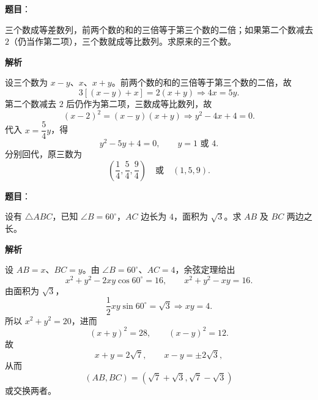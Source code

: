 \begin{answer}

\textbf{题目}：

三个数成等差数列，前两个数的和的三倍等于第三个数的二倍；如果第二个数减去 $2$（仍当作第二项），三个数就成等比数列。求原来的三个数。

\textbf{解析}

设三个数为 $x-y$、$x$、$x+y$。前两个数的和的三倍等于第三个数的二倍，故
\nopagebreak[4]
\[
3[(x-y)+x]=2(x+y)\Rightarrow4x=5y.
\]
第二个数减去 $2$ 后仍作为第二项，三数成等比数列，故
\nopagebreak[4]
\[
(x-2)^2=(x-y)(x+y)\Rightarrow y^2-4x+4=0.
\]
代入 $x=\dfrac54y$，得
\nopagebreak[4]
\[
y^2-5y+4=0,\qquad y=1\text{ 或 }4.
\]
分别回代，原三数为
\nopagebreak[4]
\[
\left(\frac14,\frac54,\frac94\right)\quad\text{或}\quad(1,5,9).
\]


\end{answer}
\begin{answer}

\textbf{题目}：

设有 $\triangle ABC$，已知 $\angle B=60^\circ$，$AC$ 边长为 $4$，面积为 $\sqrt3$。求 $AB$ 及 $BC$ 两边之长。

\textbf{解析}
\nopagebreak[4]
\begin{center}\end{center}
\nopagebreak[4]
设 $AB=x$、$BC=y$。由 $\angle B=60^\circ$、$AC=4$，余弦定理给出
\nopagebreak[4]
\[
x^2+y^2-2xy\cos60^\circ=16,
\qquad x^2+y^2-xy=16.
\]
由面积为 $\sqrt3$，
\nopagebreak[4]
\[
\frac12xy\sin60^\circ=\sqrt3\Rightarrow xy=4.
\]
所以 $x^2+y^2=20$，进而
\nopagebreak[4]
\[
(x+y)^2=28,\qquad (x-y)^2=12.
\]
故
\nopagebreak[4]
\[
x+y=2\sqrt7,\qquad x-y=\pm2\sqrt3,
\]
从而
\nopagebreak[4]
\[
(AB,BC)=(\sqrt7+\sqrt3,\sqrt7-\sqrt3)
\]
或交换两者。


\end{answer}
